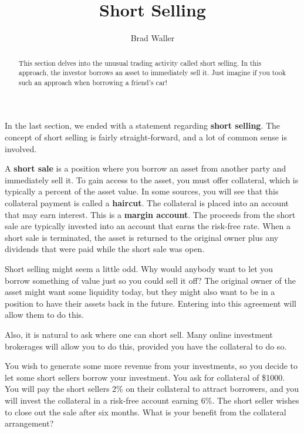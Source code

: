 \documentclass{ximera}
\author{Brad Waller}
\title{Short Selling}
\begin{document}
\begin{abstract}
This section delves into the unusual trading activity called short selling. In this approach, the investor borrows an asset to immediately sell it. Just imagine if you took such an approach when borrowing a friend's car!
\end{abstract}

\maketitle

In the last section, we ended with a statement regarding {\bf short selling}. The concept of short selling is fairly straight-forward, and a lot of common sense is involved. 

\begin{definition}\label{def{40}}
A {\bf short sale} is a position where you borrow an asset from another party and immediately sell it. To gain access to the asset, you must offer collateral, which is typically a percent of the asset value. In some sources, you will see that this collateral payment is called a {\bf haircut}. The collateral is placed into an account that may earn interest. This is a {\bf margin account}. The proceeds from the short sale are typically invested into an account that earns the risk-free rate. When a short sale is terminated, the asset is returned to the original owner plus any dividends that were paid while the short sale was open. 
\end{definition}

\begin{remark}
Short selling might seem a little odd. Why would anybody want to let you borrow something of value just so you could sell it off? The original owner of the asset might want some liquidity today, but they might also want to be in a position to have their assets back in the future. Entering into this agreement will allow them to do this.

Also, it is natural to ask where one can short sell. Many online investment brokerages will allow you to do this, provided you have the collateral to do so.
\end{remark}

\begin{example}
You wish to generate some more revenue from your investments, so you decide to let some short sellers borrow your investment. You ask for collateral of \$1000. You will pay the short sellers 2\% on their collateral to attract borrowers, and you will invest the collateral in a risk-free account earning 6\%. The short seller wishes to close out the sale after six months. What is your benefit from the collateral arrangement?
\end{example}
\end{document}

